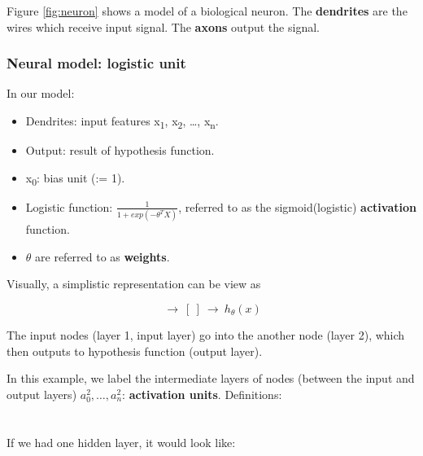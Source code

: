         Figure \ref{fig:neuron} shows a model of a biological neuron. The \textbf{dendrites} are the wires which receive input signal. The \textbf{axons} output the signal.

        \subsubsection{Neural model: logistic unit}
            In our model:
            \begin{itemize}
                \item Dendrites: input features x\textsubscript{1}, x\textsubscript{2}, \dots, x\textsubscript{n}.
                \item Output: result of hypothesis function.
                \item x\textsubscript{0}: bias unit (:= 1).
                \item Logistic function: $\frac{1}{1+exp(-\theta^T X)}$, referred to as the sigmoid(logistic) \textbf{activation} function.
                \item $\theta$ are referred to as \textbf{weights}.
            \end{itemize}

            Visually, a simplistic representation can be view as 

            \begin{equation}
                [x_0\; x_1\; x_2]\: \rightarrow \: [\:]\: \rightarrow\: h_\theta (x)
                \label{fig:visual-nn-repr}
            \end{equation}


            The input nodes (layer 1, input layer) go into the another node (layer 2), which then outputs to hypothesis function (output layer).

            In this example, we label the intermediate layers of nodes (between the input and output layers) $a^2_0, \dots, a^2_n$: \textbf{activation units}. 
            Definitions:\\

            \\

            \\
          
            If we had one hidden layer, it would look like:

